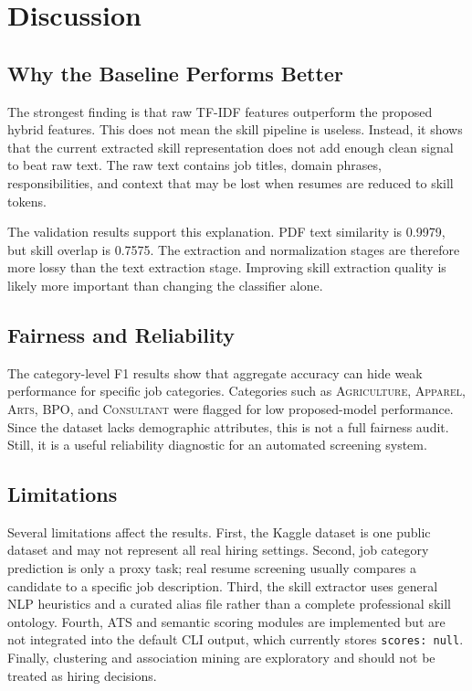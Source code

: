 \documentclass[sigconf, authorversion, nonacm]{acmart}
\begin{document}
\section{Discussion}

\subsection{Why the Baseline Performs Better}

The strongest finding is that raw TF-IDF features outperform the proposed hybrid features. This does not mean the skill pipeline is useless. Instead, it shows that the current extracted skill representation does not add enough clean signal to beat raw text. The raw text contains job titles, domain phrases, responsibilities, and context that may be lost when resumes are reduced to skill tokens.

The validation results support this explanation. PDF text similarity is 0.9979, but skill overlap is 0.7575. The extraction and normalization stages are therefore more lossy than the text extraction stage. Improving skill extraction quality is likely more important than changing the classifier alone.

\subsection{Fairness and Reliability}

The category-level F1 results show that aggregate accuracy can hide weak performance for specific job categories. Categories such as \textsc{Agriculture}, \textsc{Apparel}, \textsc{Arts}, \textsc{BPO}, and \textsc{Consultant} were flagged for low proposed-model performance. Since the dataset lacks demographic attributes, this is not a full fairness audit. Still, it is a useful reliability diagnostic for an automated screening system.

\subsection{Limitations}

Several limitations affect the results. First, the Kaggle dataset is one public dataset and may not represent all real hiring settings. Second, job category prediction is only a proxy task; real resume screening usually compares a candidate to a specific job description. Third, the skill extractor uses general NLP heuristics and a curated alias file rather than a complete professional skill ontology. Fourth, ATS and semantic scoring modules are implemented but are not integrated into the default CLI output, which currently stores \texttt{scores: null}. Finally, clustering and association mining are exploratory and should not be treated as hiring decisions.
\end{document}
